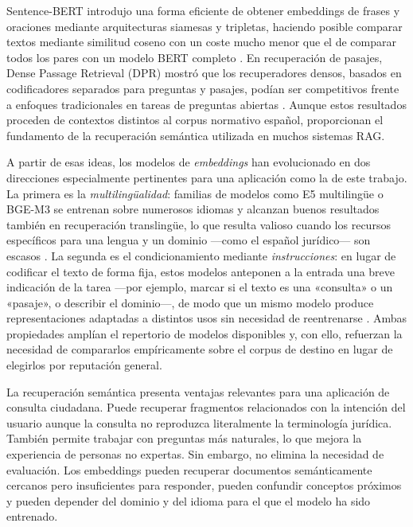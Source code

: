 Sentence-BERT introdujo una forma eficiente de obtener embeddings de frases y oraciones mediante arquitecturas siamesas y tripletas, haciendo posible comparar textos mediante similitud coseno con un coste mucho menor que el de comparar todos los pares con un modelo BERT completo \cite{reimers2019sbert}. En recuperación de pasajes, Dense Passage Retrieval (DPR) mostró que los recuperadores densos, basados en codificadores separados para preguntas y pasajes, podían ser competitivos frente a enfoques tradicionales en tareas de preguntas abiertas \cite{karpukhin2020dpr}. Aunque estos resultados proceden de contextos distintos al corpus normativo español, proporcionan el fundamento de la recuperación semántica utilizada en muchos sistemas RAG.

A partir de esas ideas, los modelos de \emph{embeddings} han evolucionado en dos direcciones especialmente pertinentes para una aplicación como la de este trabajo. La primera es la \emph{multilingüalidad}: familias de modelos como E5 multilingüe o BGE-M3 se entrenan sobre numerosos idiomas y alcanzan buenos resultados también en recuperación translingüe, lo que resulta valioso cuando los recursos específicos para una lengua y un dominio —como el español jurídico— son escasos \cite{wang2024me5,chen2024bgem3}. La segunda es el condicionamiento mediante \emph{instrucciones}: en lugar de codificar el texto de forma fija, estos modelos anteponen a la entrada una breve indicación de la tarea —por ejemplo, marcar si el texto es una «consulta» o un «pasaje», o describir el dominio—, de modo que un mismo modelo produce representaciones adaptadas a distintos usos sin necesidad de reentrenarse \cite{su2023instructor}. Ambas propiedades amplían el repertorio de modelos disponibles y, con ello, refuerzan la necesidad de compararlos empíricamente sobre el corpus de destino en lugar de elegirlos por reputación general.

La recuperación semántica presenta ventajas relevantes para una aplicación de consulta ciudadana. Puede recuperar fragmentos relacionados con la intención del usuario aunque la consulta no reproduzca literalmente la terminología jurídica. También permite trabajar con preguntas más naturales, lo que mejora la experiencia de personas no expertas. Sin embargo, no elimina la necesidad de evaluación. Los embeddings pueden recuperar documentos semánticamente cercanos pero insuficientes para responder, pueden confundir conceptos próximos y pueden depender del dominio y del idioma para el que el modelo ha sido entrenado.

